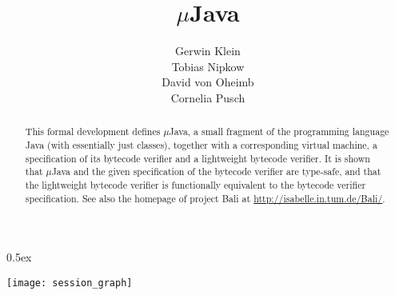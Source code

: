 \documentclass[11pt,a4paper]{article}
\newcommand{\mJava}{$\mu$Java}
\begin{document}
\title{\mJava}
\author{Gerwin Klein \\ Tobias Nipkow \\ David von Oheimb \\ Cornelia Pusch}
\maketitle

\begin{abstract}\noindent
  This formal development defines {\mJava}, a small fragment of the
  programming language Java (with essentially just classes), together with a
  corresponding virtual machine, a specification of its bytecode verifier
  and a lightweight bytecode verifier.
  It is shown that {\mJava} and the given specification of the bytecode
  verifier are type-safe, and that the lightweight bytecode verifier
  is functionally equivalent to the bytecode verifier specification.
  See also the homepage of project Bali at \url{http://isabelle.in.tum.de/Bali/}.
\end{abstract}

\tableofcontents
\parindent 0pt \parskip 0.5ex

\begin{center}
  \texttt{[image: session\_graph]}
\end{center}

\newpage


\newpage
\nocite{*}


\end{document}
